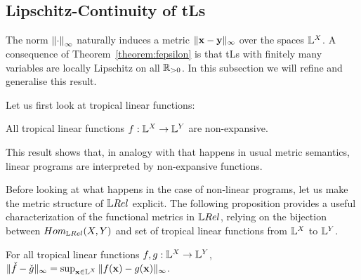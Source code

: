 \subsection{Lipschitz-Continuity of tLs}%


The norm $\left\lVert\cdot\right\rVert_\infty$ naturally induces a metric $\|\mathbf{x}-\mathbf{y}\|_{\infty}$ over the spaces $\mathbb{L}^{X}$. 
A consequence of Theorem~\ref{theorem:fepsilon} is that tLs with finitely many variables are locally Lipschitz on all $\mathbb{R}_{>0}$.
In this subsection we will refine and generalise this result.
%

Let us first look at tropical linear functions:


\begin{proposition}\label{prop:troplinear}
All tropical linear functions $f: \mathbb{L}^{X}\to \mathbb{L}^{Y}$ are non-expansive.  
\end{proposition}
This result shows that, in analogy with that happens in usual metric semantics, linear programs are interpreted by non-expansive functions. 

Before looking at what happens in the case of non-linear programs, let us make the metric structure of $\LREL$ explicit. 
The following proposition provides a useful characterization of the functional metrics in $\LREL$, relying on 
the bijection between $\HOM{\LREL}{X}{Y}$ and set of tropical linear functions from $\mathbb{L}^{X}$ to $\mathbb{L}^{Y}$.
\begin{proposition}
For all tropical linear functions $f,g:\mathbb{L}^{X}\to \mathbb{L}^{Y}$, $\| \check f-\check g\|_{\infty} =  \sup_{\mathbf{x}\in \mathbb{L}^{X}}
\| f(\mathbf{x})-g(\mathbf{x})\|_{\infty}$.\end{proposition}

